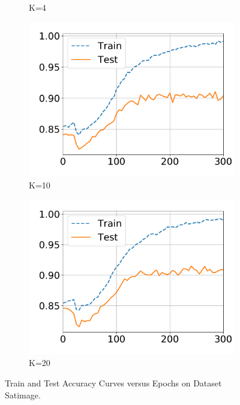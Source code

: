 \begin{figure}[!ht]
\begin{subfigure}{0.33\textwidth}
    \vspace{-0.8cm}
    \caption{K=4}
  \end{subfigure}
  \centering
  \begin{subfigure}{.33\textwidth}
    \centering
    \includegraphics[width=1\linewidth]{images/supply/train_curves/satimage_10.pdf}
    \vspace{-0.8cm}
    \caption{K=10}
  \end{subfigure}
  \centering
  \begin{subfigure}{.33\textwidth}
    \centering
    \includegraphics[width=1\linewidth]{images/supply/train_curves/satimage_20.pdf}
    \vspace{-0.8cm}
    \caption{K=20}
  \end{subfigure}
  \vspace{-0.3cm}
  \caption{Train and Test Accuracy Curves versus Epochs on Dataset Satimage.}
  \vspace{0.3cm}
  \label{fig:class-satimage}
\end{figure}
